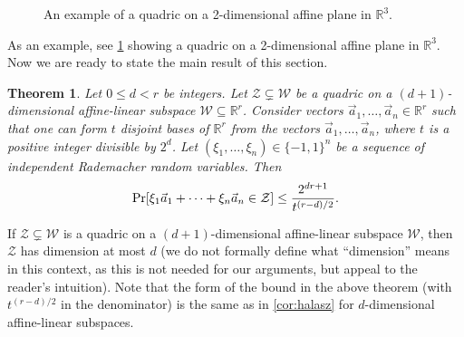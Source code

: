 \documentclass[english]{article}
\newtheorem{theorem}{Theorem}[section]
\theoremstyle{remark}
\numberwithin{equation}{section}
\numberwithin{figure}{section}
\newcommand{\su}{\subseteq}
\newcommand{\RR}{\mathbb{R}}
\newcommand{\mb}{\mathbb}
\let\originalleft\left
\let\originalright\right
\renewcommand{\left}{\mathopen{}\mathclose\bgroup\originalleft}
\renewcommand{\right}{\aftergroup\egroup\originalright}
\begin{document}
\begin{figure}[t]
\begin{center}
\end{center}\caption{\label{fig:quadric}An example of a quadric on a 2-dimensional affine plane in $\mb R^3$.}
\end{figure}


As an example, see \cref{fig:quadric} showing a quadric on a 2-dimensional affine plane in $\RR^{3}$. Now we are ready to state the main result of this section.

\begin{theorem}
\label{thm:quadratic-geometric}Let $0\le d<r$ be integers. Let $\mathcal{Z}\subsetneq\mathcal{W}$
be a quadric on a $(d+1)$-dimensional affine-linear
subspace $\mathcal{W}\su\RR^{r}$. Consider vectors $\vec{a}_{1},\dots,\vec{a}_{n}\in\mathbb{R}^{r}$ such that one can form $t$ disjoint bases of $\mathbb{R}^{r}$ from the vectors $\vec{a}_{1},\dots, \vec{a}_n$, where $t$ is a positive integer divisible by $2^d$. Let $(\xi_1,\dots,\xi_n)\in\{-1,1\}^{n}$ be a sequence of independent Rademacher random variables. Then 
\[
\Pr\left[\xi_{1}\vec{a}_{1}+\dots+\xi_{n}\vec{a}_{n}\in\mathcal{Z}\right]\le\frac{2^{dr+1}}{t^{(r-d)/2}}.
\]
\end{theorem}

If $\mathcal{Z}\subsetneq\mathcal{W}$
is a quadric on a $(d+1)$-dimensional affine-linear
subspace $\mathcal{W}$, then $\mathcal{Z}$ has dimension at most $d$ (we do not formally define what ``dimension'' means in this context, as this is not needed for our arguments, but appeal to the reader's intuition). Note that the form of the bound in the above theorem (with $t^{(r-d)/2}$ in the denominator) is the same as in \cref{cor:halasz} for $d$-dimensional affine-linear subspaces.
\end{document}
